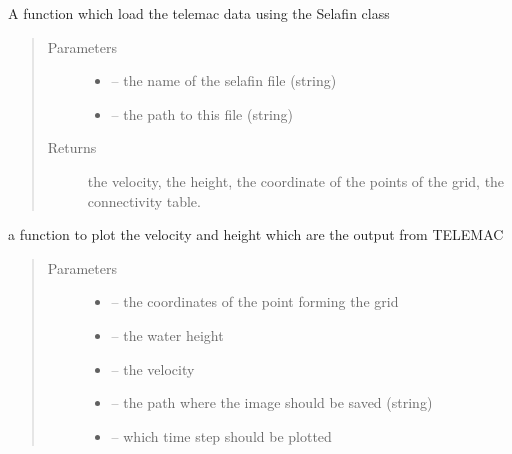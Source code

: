 \documentclass[letterpaper,10pt,english]{sphinxmanual}
\begin{document}
\begin{fulllineitems}
\label{\detokenize{index:src.selafin_habby1.load_telemac}}
A function which load the telemac data using the Selafin class
\begin{quote}\begin{description}
\item[{Parameters}] \leavevmode\begin{itemize}
\item {} 
 -- the name of the selafin file (string)

\item {} 
 -- the path to this file (string)

\end{itemize}

\item[{Returns}] \leavevmode
the velocity, the height, the coordinate of the points of the grid, the connectivity table.

\end{description}\end{quote}

\end{fulllineitems}


\begin{fulllineitems}
\label{\detokenize{index:src.selafin_habby1.plot_vel_h}}
a function to plot the velocity and height which are the output from TELEMAC
\begin{quote}\begin{description}
\item[{Parameters}] \leavevmode\begin{itemize}
\item {} 
 -- the coordinates of the point forming the grid

\item {} 
 -- the  water height

\item {} 
 -- the velocity

\item {} 
 -- the path where the image should be saved (string)

\item {} 
 -- which time step should be plotted

\end{itemize}

\end{description}\end{quote}

\end{fulllineitems}
\end{document}
